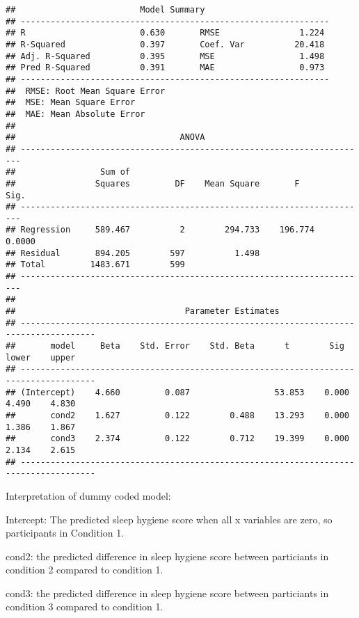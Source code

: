 \documentclass[]{article}
\begin{document}
\begin{verbatim}
##                         Model Summary                          
## --------------------------------------------------------------
## R                       0.630       RMSE                1.224 
## R-Squared               0.397       Coef. Var          20.418 
## Adj. R-Squared          0.395       MSE                 1.498 
## Pred R-Squared          0.391       MAE                 0.973 
## --------------------------------------------------------------
##  RMSE: Root Mean Square Error 
##  MSE: Mean Square Error 
##  MAE: Mean Absolute Error 
## 
##                                 ANOVA                                  
## ----------------------------------------------------------------------
##                 Sum of                                                
##                Squares         DF    Mean Square       F         Sig. 
## ----------------------------------------------------------------------
## Regression     589.467          2        294.733    196.774    0.0000 
## Residual       894.205        597          1.498                      
## Total         1483.671        599                                     
## ----------------------------------------------------------------------
## 
##                                  Parameter Estimates                                  
## -------------------------------------------------------------------------------------
##       model     Beta    Std. Error    Std. Beta      t        Sig     lower    upper 
## -------------------------------------------------------------------------------------
## (Intercept)    4.660         0.087                 53.853    0.000    4.490    4.830 
##       cond2    1.627         0.122        0.488    13.293    0.000    1.386    1.867 
##       cond3    2.374         0.122        0.712    19.399    0.000    2.134    2.615 
## -------------------------------------------------------------------------------------
\end{verbatim}

Interpretation of dummy coded model:

Intercept: The predicted sleep hygiene score when all x variables are
zero, so participants in Condition 1.

cond2: the predicted difference in sleep hygiene score between
particiants in condition 2 compared to condition 1.

cond3: the predicted difference in sleep hygiene score between
particiants in condition 3 compared to condition 1.
\end{document}

